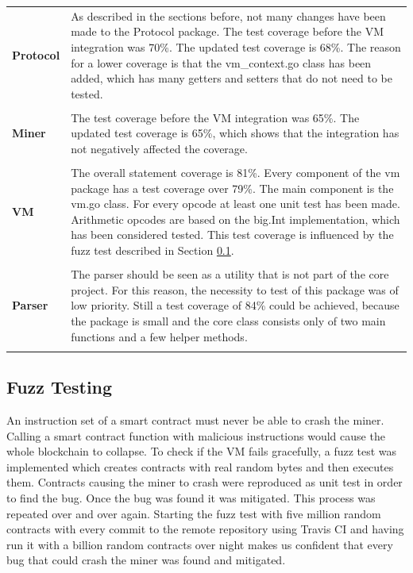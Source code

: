 \begin{tabular}[t]{ p{3cm} p{12.5cm}}
\raggedright
\textbf{Protocol} &
As described in the sections before, not many changes have been made to the Protocol package. The test coverage before the VM integration was 70\%. The updated test coverage is 68\%. The reason for a lower coverage is that the vm\_context.go class has been added, which has many getters and setters that do not need to be tested. \\ \\
\textbf{Miner} &
The test coverage before the VM integration was 65\%. The updated test coverage is 65\%, which shows that the integration has not negatively affected the coverage. \\ \\
\textbf{VM} &
The overall statement coverage is 81\%. Every component of the vm package has a test coverage over 79\%. The main component is the vm.go class. For every opcode at least one unit test has been made. Arithmetic opcodes are based on the big.Int implementation, which has been considered tested. This test coverage is influenced by the fuzz test described in Section \ref{fuzz_testing}. \\ \\
\textbf{Parser} &
The parser should be seen as a utility that is not part of the core project. For this reason, the necessity to test of this package was of low priority. Still a test coverage of 84\% could be achieved, because the package is small and the core class consists only of two main functions and a few helper methods. \\ \\
\end{tabular}
 
\subsection{Fuzz Testing} \label{fuzz_testing}
An instruction set of a smart contract must never be able to crash the miner. Calling a smart contract function with malicious instructions would cause the whole blockchain to collapse. To check if the VM fails gracefully, a fuzz test was implemented which creates contracts with real random bytes and then executes them. Contracts causing the miner to crash were reproduced as unit test in order to find the bug. Once the bug was found it was mitigated. This process was repeated over and over again. Starting the fuzz test with five million random contracts with every commit to the remote repository using Travis CI and having run it with a billion random contracts over night makes us confident that every bug that could crash the miner was found and mitigated. 

